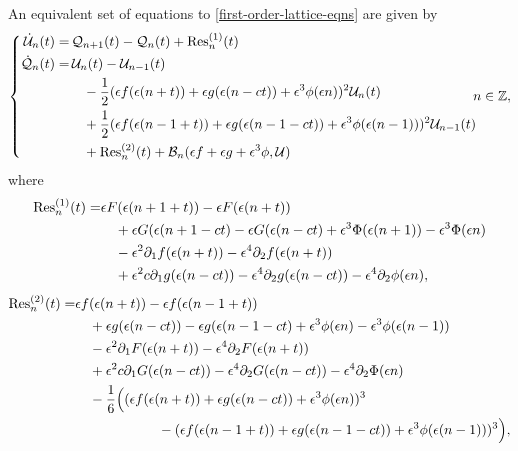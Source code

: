 An equivalent set of equations to \cref{first-order-lattice-eqns} are given by
\begin{equation}\label{error-lattice-eqns}
	\left\{\begin{aligned}
			\dot{\mathcal U}_n(t) =& \, \mathcal Q_{n+1}(t) - \mathcal Q_n(t) +\mathrm{Res}_n^{(1)}(t) \\
\dot{\mathcal Q}_n(t) =& \, \mathcal U_n(t) - \mathcal U_{n-1}(t)  \\
&\quad - \frac 1 2 (\epsilon f(\epsilon(n+t)) + \epsilon g(\epsilon(n-ct)) + \epsilon^3\phi(\epsilon n))^2 \mathcal U_{n}(t) \\
&\quad + \frac 12  (\epsilon f(\epsilon(n-1+t)) + \epsilon g(\epsilon(n-1-ct)) + \epsilon^3\phi(\epsilon (n-1)))^2 \mathcal U_{n-1}(t) \\
&\quad +\mathrm{Res}_n^{(2)}(t) + \mathcal B_n(\epsilon f + \epsilon g + \epsilon^3 \phi,  \mathcal U) 
	\end{aligned} \right. \hspace{-0.5em}n\in\mathbb{Z},
\end{equation}
where
\begin{equation}
\begin{aligned}
	\mathrm{Res}_n^{(1)}(t) =& \epsilon F(\epsilon(n+1+t)) - \epsilon F(\epsilon(n+t)) \\
	&\quad + \epsilon G(\epsilon(n+1-c t) - \epsilon G(\epsilon(n-c t) + \epsilon^3 \Phi(\epsilon (n+1))   - \epsilon^3 \Phi(\epsilon n) \\
	&\quad - \epsilon^2 \partial_1 f(\epsilon(n+t)) - \epsilon^4 \partial_2
	f(\epsilon(n+t)) \\
	&\quad + \epsilon^2 c \partial_1 g(\epsilon(n-ct)) - \epsilon^4 \partial_2 g(\epsilon(n-ct)) - \epsilon^4 \partial_2 \phi(\epsilon n) ,
\end{aligned}
\end{equation}
\begin{equation}
\begin{aligned}
	\mathrm{Res}_n^{(2)}(t) =& \epsilon f(\epsilon(n+t)) - \epsilon f(\epsilon(n-1+t)) \\
	&\quad+ \epsilon g(\epsilon(n-c t)) - \epsilon g(\epsilon(n-1-c t) + \epsilon^3 \phi(\epsilon n) - \epsilon^3 \phi(\epsilon (n-1)) \\
	&\quad - \epsilon^2 \partial_1 F(\epsilon(n+t)) - \epsilon^4 \partial_2
	F(\epsilon(n+t)) \\
	&\quad + \epsilon^2 c \partial_1 G(\epsilon(n-ct)) - \epsilon^4 \partial_2 G(\epsilon(n-ct)) - \epsilon^4 \partial_2 \Phi(\epsilon n) \\
	&\quad - \frac 1 6 \Big( (\epsilon f(\epsilon(n+t)) + \epsilon g(\epsilon(n-c t)) + \epsilon^3 \phi(\epsilon n))^3 \\
	&\hspace{6em} - (\epsilon f(\epsilon(n-1+t)) + \epsilon g(\epsilon(n-1-c t)) + \epsilon^3 \phi(\epsilon (n-1)))^3 \Big),
\end{aligned}
\end{equation}
